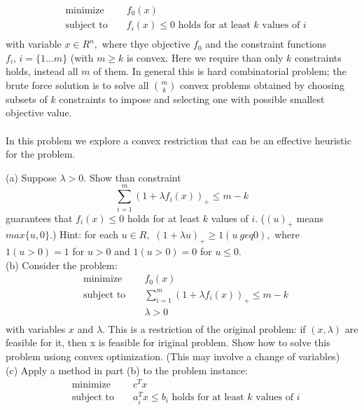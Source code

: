 \documentclass{article}
\begin{document}
\begin{align*}
&\text{minimize } && f_0(x) \\
&\text{subject to } && f_i(x) \leq 0 \text{ holds for at least } k \text{ values of }i\\
\end{align*} 
with variable $x \in R^n,$ where thye objective $f_0$ and the constraint functions $f_i, \, i = \{1...m\} $ (with $m \geq k$ is convex. Here we require than only $k$ constraints holds, instead all $m$ of them. In general this is hard combinatorial problem; the brute force solution is to solve all $m \choose k$ convex problems obtained by choosing subsets of $k$ constraints to impose and selecting one with possible smallest objective value. \\ \\
In this problem we explore a convex restriction that can be an effective heuristic for the problem.

(a) Suppose $\lambda > 0.$ Show than constraint
$$
\sum_{i = 1}^{m} (1 + \lambda f_i(x))_+ \leq m - k
$$
guarantees that $f_i(x) \leq 0 $ holds for at least $k$
values of $i.$ ($(u)_+$ means $max\{u, 0\}.$) Hint: for each $u \in R,$ $(1 + \lambda u)_+ \geq 1(u \ geq 0),$ where $1(u > 0)= 1$ for $u > 0$ and $1(u > 0) = 0$
for $u \leq 0.$\\

(b) Consider the problem:
\begin{align*}
&\text{minimize } && f_0(x) \\
&\text{subject to } && \sum_{i = 1}^{m} (1 + \lambda
 f_i(x))_+ \leq m - k\\
& && \lambda > 0 \\ 
\end{align*} 
with variables $x$ and $\lambda.$ This is a restriction of the original problem: if $(x, \lambda)$ are feasible for it, then x is feasible for iriginal problem. Show how to solve this problem usiong convex optimization. (This may involve a change of variables)
\\

(c) Apply a method in part (b) to the problem instance:
\begin{align*}
&\text{minimize } && c^T x \\
&\text{subject to } && a_i^T x \leq b_i \text{ holds for at least } k \text{ values of }i\\
\end{align*} 
\end{document}
